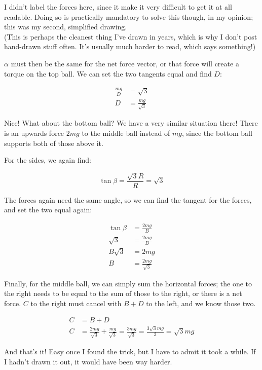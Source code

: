 \documentclass[8.01x]{subfiles}
\begin{document}
I didn't label the forces here, since it make it very difficult to get it at all readable. Doing so is practically mandatory to solve this though, in my opinion; this was my second, simplified drawing.\\
(This is perhaps the cleanest thing I've drawn in years, which is why I don't post hand-drawn stuff often. It's usually much harder to read, which says something!)

$\alpha$ must then be the same for the net force vector, or that force will create a torque on the top ball. We can set the two tangents equal and find $D$:

\begin{align}
\frac{m g}{D} &= \sqrt{3}\\
D &= \frac{m g}{\sqrt{3}}
\end{align}

Nice! What about the bottom ball? We have a very similar situation there! There is an upwards force $2 m g$ to the middle ball instead of $m g$, since the bottom ball supports both of those above it.

For the sides, we again find:

\begin{equation}
\tan \beta = \frac{\sqrt{3} R}{R} = \sqrt{3}
\end{equation}

The forces again need the same angle, so we can find the tangent for the forces, and set the two equal again:

\begin{align}
\tan \beta &= \frac{2 m g}{B}\\
\sqrt{3} &= \frac{2 m g}{B}\\
B \sqrt{3} &= 2 m g\\
B &= \frac{2 m g}{\sqrt{3}}
\end{align}

Finally, for the middle ball, we can simply sum the horizontal forces; the one to the right needs to be equal to the sum of those to the right, or there is a net force. $C$ to the right must cancel with $B + D$ to the left, and we know those two.

\begin{align}
C &= B + D\\
C &= \frac{2 m g}{\sqrt{3}} + \frac{m g}{\sqrt{3}} = \frac{3 m g}{\sqrt{3}} = \frac{3 \sqrt{3} m g}{3} = \sqrt{3} m g
\end{align}

And that's it! Easy once I found the trick, but I have to admit it took a while. If I hadn't drawn it out, it would have been way harder.
\end{document}
